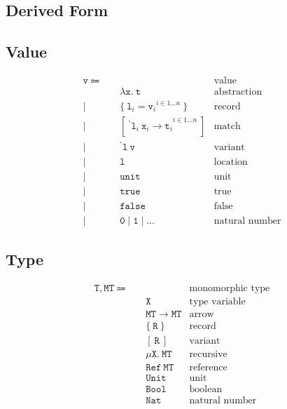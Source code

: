 \documentclass{report}
\newcommand{\code}{\mathtt}
\newcommand{\backtick}{{}^{\backprime}}
\begin{document}
\subsection{Derived Form}

\subsection{Value}

\begin{align*}
\code{v} \Coloneqq \quad & & \text{value} \\
& \code{\lambda x.\ t} & \text{abstraction} \\
| \quad & \{\ {\code{l}_i = \code{v}_i}^{i \in 1\dots n}\ \} & \text{record} \\
| \quad & [ {\code{\ \backtick l}_i\ \code{x}_i \rightarrow \code{t}_i}^{i \in 1\dots n} \ ] & \text{match} \\
| \quad & \code{\backtick l\ v} & \text{variant} \\
| \quad & \code{l} & \text{location} \\
| \quad & \code{unit} & \text{unit} \\
| \quad & \code{true} & \text{true} \\
| \quad & \code{false} & \text{false} \\
| \quad & \code{0} \mid \code{1} \mid \dots & \text{natural number}
\end{align*}

\subsection{Type}

\begin{align*}
\code{T, MT} \Coloneqq \quad & & \text{monomorphic type} \\
& \code{X} & \text{type variable} \\
& \code{MT \rightarrow MT} & \text{arrow} \\
& \code{\{\ R\ \}} & \text{record} \\
& \code{[\ R\ ]} & \text{variant} \\
& \code{\mu X.\ MT} & \text{recursive} \\
& \code{Ref\ MT} & \text{reference} \\
& \code{Unit} & \text{unit} \\
& \code{Bool} & \text{boolean} \\
& \code{Nat} & \text{natural number}
\end{align*}
\end{document}
